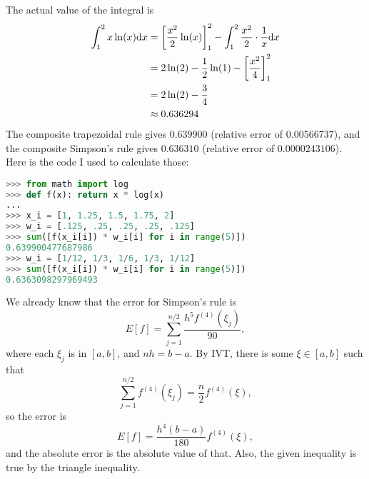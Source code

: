 \documentclass{article}
\begin{document}
\bigskip
\begin{prob}
\end{prob}
The actual value of the integral is \begin{align*}
    \int_1^2 x \ln (x) \mathrm{d} x &= \left[ \frac{x^2}{2} \ln(x) \right]_1^2 - \int_1^2 \frac{x^2}{2} \cdot \frac{1}{x }\mathrm{d} x \\
                            &= 2 \ln(2) - \frac{1}{2} \ln(1) - \left[ \frac{x^2}{4} \right]_1^2 \\
                            &= 2 \ln(2) - \frac{3}{4} \\
                            &\approx 0.636294
\end{align*}
The composite trapezoidal rule gives $0.639900$ (relative error of $0.00566737$), and the composite Simpson's rule gives $0.636310$ (relative error of $0.0000243106$). Here is the code I used to calculate those:
\par
\begin{lstlisting}[language=Python]
>>> from math import log
>>> def f(x): return x * log(x)
... 
>>> x_i = [1, 1.25, 1.5, 1.75, 2]
>>> w_i = [.125, .25, .25, .25, .125]
>>> sum([f(x_i[i]) * w_i[i] for i in range(5)])
0.639900477687986
>>> w_i = [1/12, 1/3, 1/6, 1/3, 1/12]
>>> sum([f(x_i[i]) * w_i[i] for i in range(5)])
0.6363098297969493
\end{lstlisting}

\bigskip
\begin{prob}
\end{prob}
We already know that the error for Simpson's rule is
\[ E[f] = \sum_{j=1}^{n/2} \frac{h^5f^{(4)}(\xi_j)}{90}, \]
where each $\xi_j$ is in $[a,b]$, and $nh=b-a$. By IVT, there is some $\xi \in [a,b]$ such that
\[ \sum_{j=1}^{n/2} f^{(4)}(\xi_j) = \frac{n}{2} f^{(4)}(\xi), \]
so the error is
\[ E[f] = \frac{h^4(b-a)}{180} f^{(4)}(\xi), \]
and the absolute error is the absolute value of that. Also, the given inequality is true by the triangle inequality.
\end{document}
